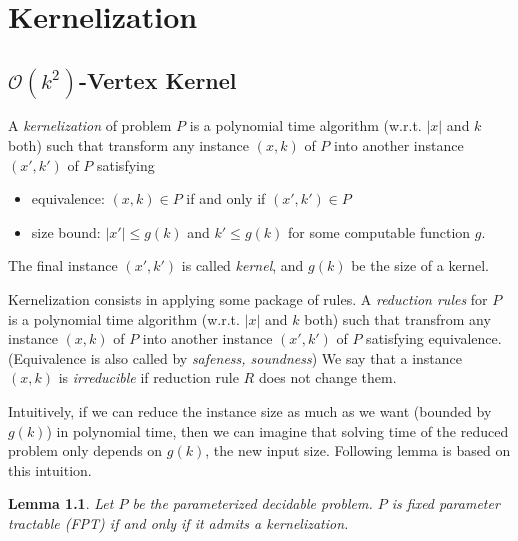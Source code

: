 \documentclass[12pt, a4paper, openany, twoside]{book}
\newtheorem{lem}[thm]{Lemma}
\theoremstyle{definition}
\theoremstyle{remark}
\newcommand{\CO}{{\mathcal {O}}} \newcommand{\CP}{{\mathcal {P}}}
\theoremstyle{plain}
\numberwithin{equation}{section}
\begin{document}
\newpage

\chapter{Kernelization}

\section{$\CO(k^2)$-Vertex Kernel}

\begin{tcolorbox}[colback=yellow!10!white,colframe=brown!75!black,title=Kernelization]

A \textit{kernelization} of problem $P$ is a polynomial time algorithm (w.r.t. $|x|$ and $k$ both) 
such that transform any instance $(x, k)$ of $P$ into another instance $(x', k')$ of $P$ satisfying 
\begin{itemize}
    \item equivalence: $(x, k) \in P$ if and only if $(x', k') \in P$
    \item size bound: $|x'| \leq g(k)$ and $k' \leq g(k)$ for some computable function $g$. 
\end{itemize}
The final instance $(x', k')$ is called \textit{kernel}, and $g(k)$ be the size of a kernel. 

\end{tcolorbox}

\begin{tcolorbox}[colback=yellow!10!white,colframe=brown!75!black,title=Reduction Rules]

Kernelization consists in applying some package of rules. A \textit{reduction rules} for $P$ is a 
polynomial time algorithm (w.r.t. $|x|$ and $k$ both) such that transfrom any instance $(x, k)$ of $P$ into another instance $(x', k')$ of $P$ satisfying 
equivalence. (Equivalence is also called by \textit{safeness, soundness}) We say that a instance $(x, k)$ is \textit{irreducible} if 
reduction rule $R$ does not change them. 

\end{tcolorbox}

Intuitively, if we can reduce the instance size as much as we want (bounded by $g(k)$) in polynomial time, 
then we can imagine that solving time of the reduced problem only depends on $g(k)$, the new input size. Following lemma is based on this intuition. 

\begin{lem}
    
Let $P$ be the parameterized decidable problem. $P$ is fixed parameter tractable (FPT) if and only if it admits a kernelization. 

\end{lem}
\end{document}
